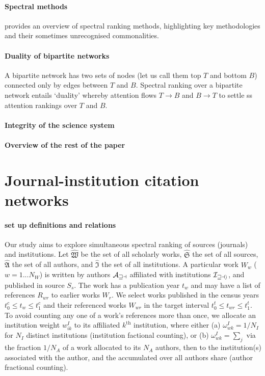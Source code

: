 \documentclass[10pt]{article}
\begin{document}
\paragraph{Spectral methods}
\cite{vignaSpectralRanking2016} provides an overview of spectral ranking methods, highlighting key methodologies and their sometimes unrecognised commonalities. 

\paragraph{Duality of bipartite networks}
A bipartite network has two sets of nodes (let us call them top $T$ and bottom $B$) connected only by edges between $T$ and $B$. Spectral ranking over a bipartite network entails `duality' \citep[e.g. ][]{breigerDualityPersonsGroups1974a} whereby attention flows $T \rightarrow B$ and $B \rightarrow T$ to settle ss attention rankings over $T$ and $B$. 

\paragraph{Integrity of the science system}

\paragraph{Overview of the rest of the paper}

\section{Journal-institution citation networks}

\paragraph{set up definitions and relations}
Our study aims to explore simultaneous spectral ranking of sources (journals) and institutions.
Let $\mathfrak{\hat{W}}$ be the set of all scholarly works, $\mathfrak{\hat{S}}$ the set of all sources, $\mathfrak{\hat{A}}$ the set of all authors, and $\mathfrak{\hat{I}}$ the set of all institutions.
A particular work $W_w$ ($w = 1...N_W$) is written by authors $\cal{A_{wa}}$ affiliated with institutions $\cal{I_{wai}}$, and published in source $S_s$. The work has a publication year $t_w$ and may have a list of references $R_{wr}$ to earlier works $W_r$. 
We select works published in the census years $t^c_0 \le t_w \le t^c_1$ and their referenced works $W_{wr}$ in the target interval $t^t_0 \le t_{wr} \le t^t_1$. 
To avoid counting any one of a work's references more than once, we allocate an institution weight $w^I_{ik}$ to its affiliated $k^{\text{th}}$ institution, where either (a) $\omega^I_{wk} = 1/N_I$ for $N_I$ distinct institutions (institution factional counting), or (b) $\omega^I_{wk} = \sum_j $ via the fraction $1/N_A$ of a work allocated to its $N_A$ authors, then to the institution(s) associated with the author, and the accumulated over all authors share (author fractional counting).
\end{document}
